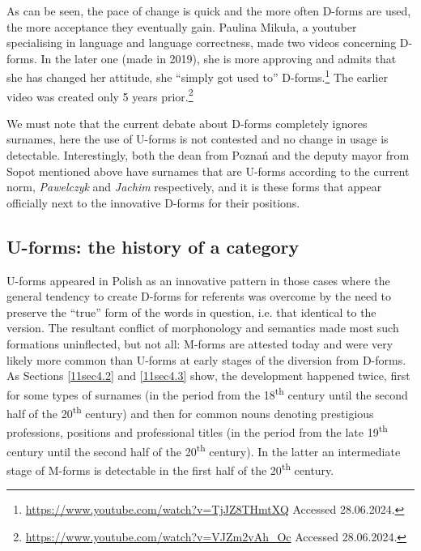\documentclass[output=paper,colorlinks,citecolor=brown]{langscibook}
\begin{document}
As can be seen, the pace of change is quick and the more often D-forms are used, the more acceptance they eventually gain. Paulina Mikuła, a youtuber specialising in language and language correctness, made two videos concerning D-forms. In the later one (made in 2019), she is more approving and admits that she has changed her attitude, she ``simply got used to'' D-forms.\footnote{\url{https://www.youtube.com/watch?v=TjJZ8THmtXQ} Accessed 28.06.2024.} The earlier video was created only 5 years prior.\footnote{\url{https://www.youtube.com/watch?v=VJZm2vAh_Oc} Accessed 28.06.2024.}

We must note that the current debate about D-forms completely ignores surnames, here the use of U-forms is not contested and no change in usage is detectable. Interestingly, both the dean from Poznań and the deputy mayor from Sopot mentioned above have surnames that are U-forms according to the current norm, \emph{Pawelczyk} and \emph{Jachim} respectively, and it is these forms that appear officially next to the innovative D-forms for their positions.

\subsection{U-forms: the history of a category} \label{11sec4.5}

U-forms appeared in Polish as an innovative pattern in those cases where the general tendency to create D-forms for  referents was overcome by the need to preserve the ``true'' form of the words in question, i.e. that identical to the  version. The resultant conflict of morphonology and semantics made most such formations uninflected, but not all: M-forms are attested today and were very likely more common than U-forms at early stages of the diversion from D-forms. As Sections \ref{11sec4.2} and \ref{11sec4.3} show, the development happened twice, first for some types of surnames (in the period from the 18\textsuperscript{th} century until the second half of the 20\textsuperscript{th} century) and then for common nouns denoting prestigious professions, positions and professional titles (in the period from the late 19\textsuperscript{th} century until the second half of the 20\textsuperscript{th} century). In the latter  an intermediate stage of M-forms is detectable in the first half of the 20\textsuperscript{th} century.
\end{document}
